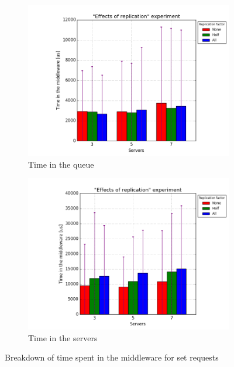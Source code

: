 \documentclass[11pt]{article}
\begin{document}
\begin{figure}
\centering
\begin{subfigure}{.5\textwidth}
	\centering
	\includegraphics[width=\linewidth]{plots/replication-set-queue}
	\caption{Time in the queue}
\end{subfigure}%
\begin{subfigure}{.5\textwidth}
	\centering
	\includegraphics[width=\linewidth]{plots/replication-set-servers}
	\caption{Time in the servers}
\end{subfigure}
\caption{Breakdown of time spent in the middleware for set requests}
\label{fig:replication-set-breakdown}
\end{figure}
\end{document}

